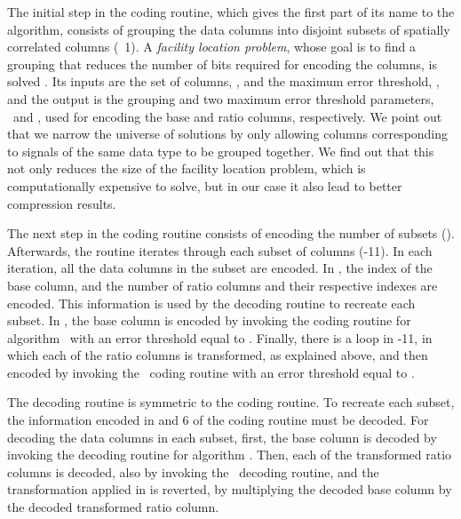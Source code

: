\vspace{-5pt}



\clearpage


The initial step in the coding routine, which gives the first part of its name to the algorithm, consists of grouping the data columns into disjoint subsets of spatially correlated columns (\Line~1). A \textit{facility location problem}, whose goal is to find a grouping that reduces the number of bits required for encoding the columns, is solved \cite{coder:gamps}. Its inputs are the set of columns, \columns, and the maximum error threshold, \maxerror, and the output is the grouping and two maximum error threshold parameters, \epsilonB\ and \epsilonR, used for encoding the base and ratio columns, respectively. We point out that we narrow the universe of solutions by only allowing columns corresponding to signals of the same data type to be grouped together. We find out that this not only reduces the size of the facility location problem, which is computationally expensive to solve, but in our case it also lead to better compression results. 


The next step in the coding routine consists of encoding the number of subsets (). Afterwards, the routine iterates through each subset of columns (-11). In each iteration, all the data columns in the subset are encoded. In , the index of the base column, and the number of ratio columns and their respective indexes are encoded. This information is used by the decoding routine to recreate each subset. In , the base column is encoded by invoking the coding routine for algorithm \apcaF\ with an error threshold equal to \epsilonB. Finally, there is a loop in -11, in which each of the ratio columns is transformed, as explained above, and then encoded by invoking the \apcaF\ coding routine with an error threshold equal to \epsilonR.


The decoding routine is symmetric to the coding routine. To recreate each subset, the information encoded in  and 6 of the coding routine must be decoded. For decoding the data columns in each subset, first, the base column is decoded by invoking the decoding routine for algorithm \apcaF. Then, each of the transformed ratio columns is decoded, also by invoking the \apcaF\ decoding routine, and the transformation applied in  is reverted, by multiplying the decoded base column by the decoded transformed ratio column.




